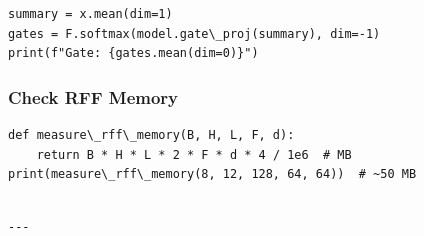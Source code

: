 \begin{lstlisting}
summary = x.mean(dim=1)
gates = F.softmax(model.gate\_proj(summary), dim=-1)
print(f"Gate: {gates.mean(dim=0)}")
\end{lstlisting}

\subsubsection{Check RFF Memory}

\begin{lstlisting}
def measure\_rff\_memory(B, H, L, F, d):
    return B * H * L * 2 * F * d * 4 / 1e6  # MB
print(measure\_rff\_memory(8, 12, 128, 64, 64))  # ~50 MB
\end{lstlisting}
\begin{lstlisting}

---
\end{lstlisting}